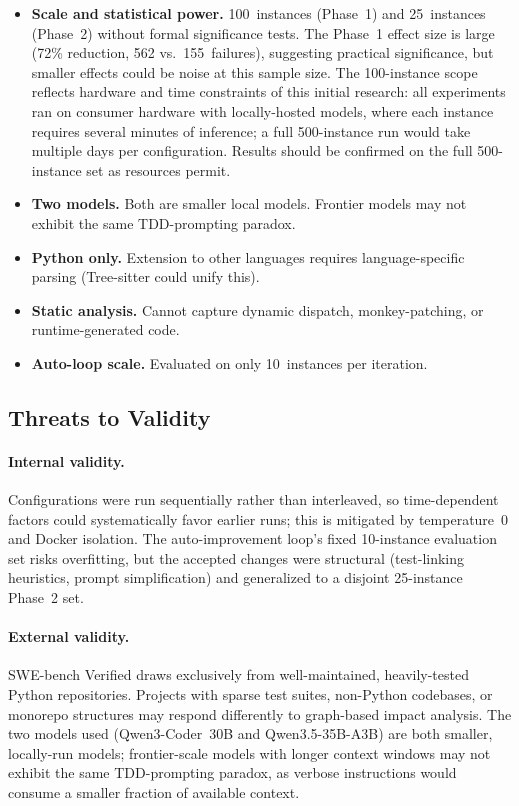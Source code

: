 \documentclass[sigconf,nonacm]{acmart}
\begin{document}
\begin{itemize}
  \item \textbf{Scale and statistical power.} 100~instances (Phase~1) and
    25~instances (Phase~2) without formal significance tests.  The Phase~1
    effect size is large (72\% reduction, 562 vs.\ 155~failures), suggesting
    practical significance, but smaller effects could be noise at this
    sample size.  The 100-instance scope reflects hardware and time
    constraints of this initial research: all experiments ran on consumer
    hardware with locally-hosted models, where each instance requires
    several minutes of inference; a full 500-instance run would take
    multiple days per configuration.  Results should be confirmed on the
    full 500-instance set as resources permit.
  \item \textbf{Two models.} Both are smaller local models.  Frontier models
    may not exhibit the same TDD-prompting paradox.
  \item \textbf{Python only.} Extension to other languages requires
    language-specific parsing (Tree-sitter could unify this).
  \item \textbf{Static analysis.} Cannot capture dynamic dispatch,
    monkey-patching, or runtime-generated code.
  \item \textbf{Auto-loop scale.} Evaluated on only 10~instances per
    iteration.
\end{itemize}

\subsection{Threats to Validity}

\paragraph{Internal validity.}
Configurations were run sequentially rather than interleaved, so
time-dependent factors could systematically favor earlier runs; this is
mitigated by temperature~0 and Docker isolation.  The auto-improvement
loop's fixed 10-instance evaluation set risks overfitting, but the
accepted changes were structural (test-linking heuristics, prompt
simplification) and generalized to a disjoint 25-instance Phase~2 set.

\paragraph{External validity.}
SWE-bench Verified draws exclusively from well-maintained,
heavily-tested Python repositories.  Projects with sparse test suites,
non-Python codebases, or monorepo structures may respond differently to
graph-based impact analysis.  The two models used (Qwen3-Coder~30B and
Qwen3.5-35B-A3B) are both smaller, locally-run models; frontier-scale
models with longer context windows may not exhibit the same
TDD-prompting paradox, as verbose instructions would consume a smaller
fraction of available context.
\end{document}
